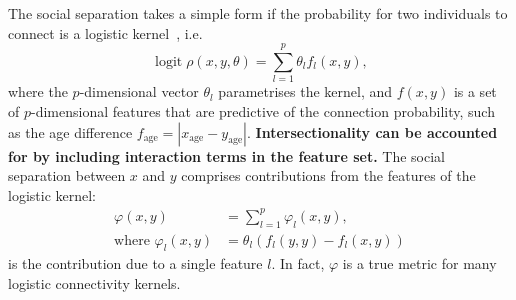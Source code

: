 \documentclass{scrartcl}
\DeclareMathOperator{\logit}{logit}
\newcommand{\abs}[1]{\left|#1\right|}
\newcommand{\change}[1]{\textbf{#1}}
\begin{document}
\begin{refsection}
The social separation takes a simple form if the probability for two individuals to connect is a logistic kernel~\cite{Hoff2002}, i.e.\
\begin{equation}
    \logit\rho(x, y, \theta) = \sum_{l=1}^p\theta_l f_l(x,y),\label{eq:logistic-kernel}
\end{equation}
where the $p$-dimensional vector $\theta_l$ parametrises the kernel, and $f(x, y)$ is a set of $p$-dimensional features that are predictive of the connection probability, such as the age difference $f_\text{age}=\abs{x_\mathrm{age}-y_\mathrm{age}}$. \change{Intersectionality can be accounted for by including interaction terms in the feature set.} The social separation between $x$ and $y$ comprises contributions from the features of the logistic kernel:
\begin{align}
    \varphi(x,y) &= \sum_{l=1}^p\varphi_l(x, y),\label{eq:social-separation-logistic}\\
    \text{where }\varphi_l(x, y) &= \theta_l\left(f_l(y, y) - f_l(x, y)\right)\label{eq:social-separation-contribution}
\end{align}
is the contribution due to a single feature $l$. In fact, $\varphi$ is a true metric for many logistic connectivity kernels.


\end{refsection}
\end{document}

